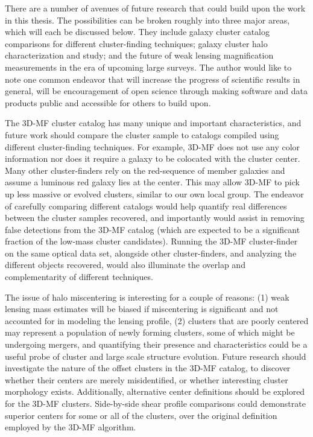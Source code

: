 There are a number of avenues of future research that could build upon the work in this thesis. The possibilities can be broken roughly into three major areas, which will each be discussed below. They include galaxy cluster catalog comparisons for different cluster-finding techniques; galaxy cluster halo characterization and study; and the future of weak lensing magnification measurements in the era of upcoming large surveys. The author would like to note one common endeavor that will increase the progress of scientific results in general, will be encouragement of open science through making software and data products public and accessible for others to build upon.

The \ac{3D-MF} cluster catalog has many unique and important characteristics, and future work should compare the cluster sample to catalogs compiled using different cluster-finding techniques. For example, \ac{3D-MF} does not use any color information nor does it require a galaxy to be colocated with the cluster center. Many other cluster-finders rely on the red-sequence of member galaxies and assume a luminous red galaxy lies at the center. This may allow \ac{3D-MF} to pick up less massive or evolved clusters, similar to our own local group. The endeavor of carefully comparing different catalogs would help quantify real differences between the cluster samples recovered, and importantly would assist in removing false detections from the \ac{3D-MF} catalog (which are expected to be a significant fraction of the low-mass cluster candidates). Running the \ac{3D-MF} cluster-finder on the same optical data set, alongside other cluster-finders, and analyzing the different objects recovered, would also illuminate the overlap and complementarity of different techniques.

The issue of halo miscentering is interesting for a couple of reasons: (1) weak lensing mass estimates will be biased if miscentering is significant and not accounted for in modeling the lensing profile, (2) clusters that are poorly centered may represent a population of newly forming clusters, some of which might be undergoing mergers, and quantifying their presence and characteristics could be a useful probe of cluster and large scale structure evolution. Future research should investigate the nature of the offset clusters in the \ac{3D-MF} catalog, to discover whether their centers are merely misidentified, or whether interesting cluster morphology exists. Additionally, alternative center definitions should be explored for the \ac{3D-MF} clusters. Side-by-side shear profile comparisons could demonstrate superior centers for some or all of the clusters, over the original definition employed by the \ac{3D-MF} algorithm.

